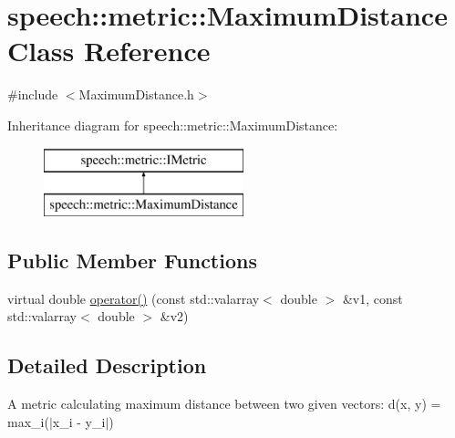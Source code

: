 \hypertarget{classspeech_1_1metric_1_1MaximumDistance}{\section{speech\+:\+:metric\+:\+:Maximum\+Distance Class Reference}
\label{classspeech_1_1metric_1_1MaximumDistance}
}


{\ttfamily \#include $<$Maximum\+Distance.\+h$>$}

Inheritance diagram for speech\+:\+:metric\+:\+:Maximum\+Distance\+:\begin{figure}[H]
\begin{center}
\leavevmode
\includegraphics[height=2.000000cm]{classspeech_1_1metric_1_1MaximumDistance}
\end{center}
\end{figure}
\subsection*{Public Member Functions}
\begin{DoxyCompactItemize}
\item 
virtual double \hyperlink{classspeech_1_1metric_1_1MaximumDistance_aa2c39fc82d79a701aecb8982ac0f2eaf}{operator()} (const std\+::valarray$<$ double $>$ \&v1, const std\+::valarray$<$ double $>$ \&v2)
\end{DoxyCompactItemize}


\subsection{Detailed Description}
A metric calculating maximum distance between two given vectors\+: d(x, y) = max\+\_\+i($\vert$x\+\_\+i -\/ y\+\_\+i$\vert$) 

